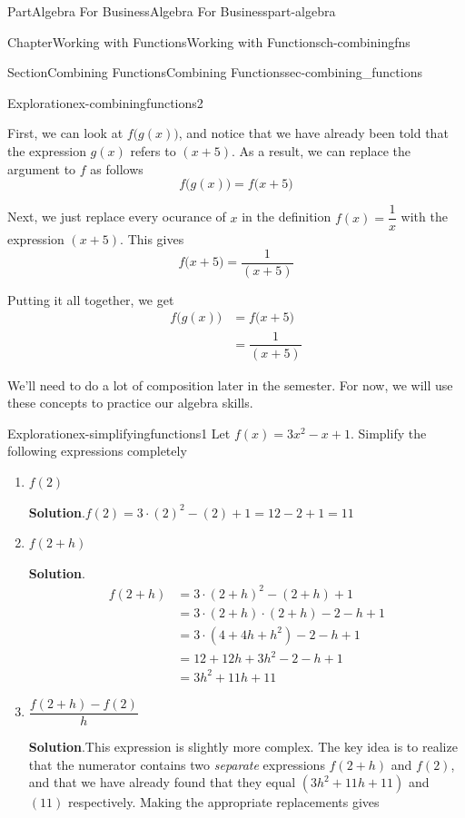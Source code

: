\documentclass{tufte-book}
\newcommand{\blocktitlefont}{\relax}
\numberwithin{equation}{chapter}
\newcommand{\amp}{&}
\begin{document}
\begin{partptx}{Part}{Algebra For Business}{}{Algebra For Business}{}{}{part-algebra}
\begin{chapterptx}{Chapter}{Working with Functions}{}{Working with Functions}{}{}{ch-combiningfns}
\begin{sectionptx}{Section}{Combining Functions}{}{Combining Functions}{}{}{sec-combining_functions}
\begin{exploration}{Exploration}{}{ex-combiningfunctions2}
\par
First, we can look at \(f\Big(g(x)\Big)\), and notice that we have already been told  that the expression \(g(x)\) refers to \((x+5)\).  As a result, we can replace the argument to \(f\) as follows%
\begin{equation*}
f\Big(g(x)\Big)  = f\Big( x+5 \Big) 
\end{equation*}
%
\par
Next, we just replace every ocurance of \(x\) in the definition \(f(x) = \dfrac{1}{x}\) with the expression \((x+5)\).  This gives%
\begin{equation*}
f\Big(x+5\Big)  = \dfrac{1}{( x+5)} 
\end{equation*}
%
\par
Putting it all together, we get%
\begin{align*}
f\Big(g(x)\Big)  \amp= f\Big( x+5 \Big)  \\
\amp= \dfrac{1}{( x+5)}  
\end{align*}
%
\end{exploration}%
We'll need to do a lot of composition later in the semester. For now, we will use these concepts to practice our algebra skills.%
\begin{exploration}{Exploration}{}{ex-simplifyingfunctions1}%
Let \(f(x) = 3x^2 - x + 1\). Simplify the following expressions completely%
\begin{enumerate}[font=\bfseries,label=(\alph*),ref=\alph*]%
\item{}\(f(2)\)%
\par\smallskip%
\noindent\textbf{\blocktitlefont Solution}.\hypertarget{ex-simplifyingfunctions1-2-2}{}\quad{}\(f(2) = 3\cdot (2)^2 - (2) + 1 = 12 - 2 + 1 = 11\)%
\item{}\(f(2+h)\)%
\par\smallskip%
\noindent\textbf{\blocktitlefont Solution}.\hypertarget{ex-simplifyingfunctions1-3-2}{}\quad{}%
\begin{align*}
f(2+h) \amp = 3\cdot (2+h)^2 - (2+h) + 1\\
\amp = 3\cdot (2+h)\cdot (2 + h) - 2 - h + 1\\
\amp = 3\cdot (4 + 4h + h^2) - 2 - h + 1\\
\amp = 12 + 12h + 3h^2 - 2 - h + 1\\
\amp = 3h^2 + 11h + 11
\end{align*}
%
\item{}\(\dfrac{f(2+h)-f(2)}{h}\)%
\par\smallskip%
\noindent\textbf{\blocktitlefont Solution}.\hypertarget{ex-simplifyingfunctions1-4-2}{}\quad{}This expression is slightly more complex.  The key idea is to realize that the numerator contains two \emph{separate} expressions \(f(2+h)\) and \(f(2)\), and that we have already found that they equal \((3h^2+11h+11)\) and \((11)\) respectively.  Making the appropriate replacements gives%

\end{enumerate}
\end{exploration}
\end{sectionptx}
\end{chapterptx}
\end{partptx}
\end{document}
